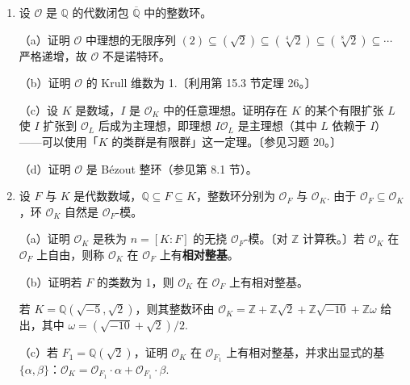 \begin{enumerate}
（在情形（i）、（ii）、（iii）中分别称素数 \(p\) 在 \(\mathcal{O}_K\) 中\textbf{惯性}、\textbf{分裂}、\textbf{分歧}。分歧素数的集合有限：当 \(D \equiv 1, 2 \pmod 4\) 时是整除 \(D\) 的素数；当 \(D \equiv 3 \pmod 4\) 时是 \(p = 2\) 与整除 \(D\) 的素数。参见第 15.5 节习题 31。）

（c）确定素数 2、3、5、7、11 在 \(K = \mathbb{Q}(\sqrt{-5})\) 的整数环 \(\mathcal{O}_K = \mathbb{Z}[\sqrt{-5}]\) 中的素理想分解。

\item 设 \(\mathcal{O}\) 是 \(\mathbb{Q}\) 的代数闭包 \(\overline{\mathbb{Q}}\) 中的整数环。

（a）证明 \(\mathcal{O}\) 中理想的无限序列 \((2) \subseteq (\sqrt{2}) \subseteq (\sqrt[4]{2}) \subseteq (\sqrt[8]{2}) \subseteq \cdots\) 严格递增，故 \(\mathcal{O}\) 不是诺特环。

（b）证明 \(\mathcal{O}\) 的 Krull 维数为 1.〔利用第 15.3 节定理 26。〕

（c）设 \(K\) 是数域，\(I\) 是 \(\mathcal{O}_K\) 中的任意理想。证明存在 \(K\) 的某个有限扩张 \(L\) 使 \(I\) 扩张到 \(\mathcal{O}_L\) 后成为主理想，即理想 \(I\mathcal{O}_L\) 是主理想（其中 \(L\) 依赖于 \(I\)）——可以使用「\(K\) 的类群是有限群」这一定理。〔参见习题 20。〕

（d）证明 \(\mathcal{O}\) 是 Bézout 整环（参见第 8.1 节）。

\item 设 \(F\) 与 \(K\) 是代数数域，\(\mathbb{Q} \subseteq F \subseteq K\)，整数环分别为 \(\mathcal{O}_F\) 与 \(\mathcal{O}_K\). 由于 \(\mathcal{O}_F \subseteq \mathcal{O}_K\)，环 \(\mathcal{O}_K\) 自然是 \(\mathcal{O}_F\)-模。

（a）证明 \(\mathcal{O}_K\) 是秩为 \(n = [K:F]\) 的无挠 \(\mathcal{O}_F\)-模。〔对 \(\mathbb{Z}\) 计算秩。〕若 \(\mathcal{O}_K\) 在 \(\mathcal{O}_F\) 上自由，则称 \(\mathcal{O}_K\) 在 \(\mathcal{O}_F\) 上有\textbf{相对整基}。

（b）证明若 \(F\) 的类数为 1，则 \(\mathcal{O}_K\) 在 \(\mathcal{O}_F\) 上有相对整基。

若 \(K = \mathbb{Q}(\sqrt{-5}, \sqrt{2})\)，则其整数环由 \(\mathcal{O}_K = \mathbb{Z}+\mathbb{Z}\sqrt{2}+\mathbb{Z}\sqrt{-10}+\mathbb{Z}\omega\) 给出，其中 \(\omega = (\sqrt{-10}+\sqrt{2})/2\).

（c）若 \(F_1 = \mathbb{Q}(\sqrt{2})\)，证明 \(\mathcal{O}_K\) 在 \(\mathcal{O}_{F_1}\) 上有相对整基，并求出显式的基 \(\{\alpha, \beta\}\)：\(\mathcal{O}_K = \mathcal{O}_{F_1}\cdot\alpha+\mathcal{O}_{F_1}\cdot\beta\).


\end{enumerate}
